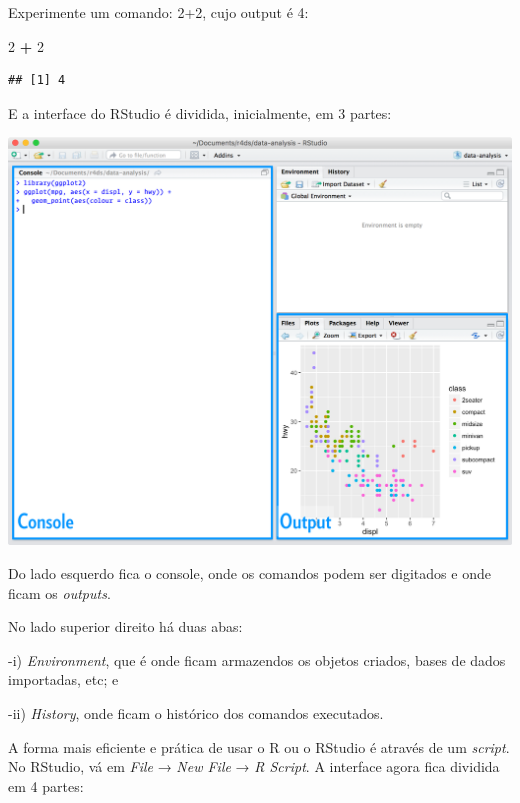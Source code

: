 \documentclass[]{book}
\newenvironment{Shaded}{\begin{snugshade}}{\end{snugshade}}
\newcommand{\DecValTok}[1]{\textcolor[rgb]{0.00,0.00,0.81}{#1}}
\newcommand{\OperatorTok}[1]{\textcolor[rgb]{0.81,0.36,0.00}{\textbf{#1}}}
\newcommand{\StringTok}[1]{\textcolor[rgb]{0.31,0.60,0.02}{#1}}
\begin{document}
Experimente um comando: 2+2, cujo output é 4:

\begin{Shaded}
\begin{Highlighting}[]
\DecValTok{2} \OperatorTok{+}\StringTok{ }\DecValTok{2}
\end{Highlighting}
\end{Shaded}

\begin{verbatim}
## [1] 4
\end{verbatim}

E a interface do RStudio é dividida, inicialmente, em 3 partes:

\begin{center}\includegraphics[width=0.9\linewidth]{imagens/rstudio-console} \end{center}

Do lado esquerdo fica o console, onde os comandos podem ser digitados e onde ficam os \emph{outputs}.

No lado superior direito há duas abas:

-i) \emph{Environment}, que é onde ficam armazendos os objetos criados, bases de dados importadas, etc; e

-ii) \emph{History}, onde ficam o histórico dos comandos executados.

A forma mais eficiente e prática de usar o R ou o RStudio é através de um \emph{script}. No RStudio, vá em \emph{File} → \emph{New File} → \emph{R Script}. A interface agora fica dividida em 4 partes:
\end{document}
